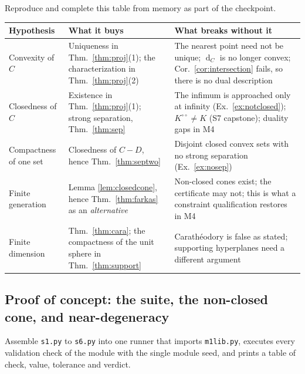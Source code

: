 \documentclass[11pt,a4paper]{article}
\theoremstyle{definition}
\theoremstyle{plain}
\theoremstyle{remark}
\DeclareMathOperator{\dist}{d}
\begin{document}
Reproduce and complete this table from memory as part of the checkpoint.

\begin{center}
\small
\begin{tabular}{@{}L{3.0cm} L{5.0cm} L{6.6cm}@{}}
\toprule
\textbf{Hypothesis} & \textbf{What it buys} & \textbf{What breaks without it} \\
\midrule
Convexity of $C$
  & Uniqueness in Thm.~\ref{thm:proj}(1); the characterization in Thm.~\ref{thm:proj}(2)
  & The nearest point need not be unique; $\dist_C$ is no longer convex;
    Cor.~\ref{cor:intersection} fails, so there is no dual description \\
Closedness of $C$
  & Existence in Thm.~\ref{thm:proj}(1); strong separation, Thm.~\ref{thm:sep}
  & The infimum is approached only at infinity (Ex.~\ref{ex:notclosed});
    $K^{\circ\circ}\ne K$ (S7 capstone); duality gaps in M4 \\
Compactness of one set
  & Closedness of $C-D$, hence Thm.~\ref{thm:septwo}
  & Disjoint closed convex sets with no strong separation
    (Ex.~\ref{ex:nosep}) \\
Finite generation
  & Lemma \ref{lem:closedcone}, hence Thm.~\ref{thm:farkas} as an \emph{alternative}
  & Non-closed cones exist; the certificate may not; this is what a constraint
    qualification restores in M4 \\
Finite dimension
  & Thm.~\ref{thm:cara}; the compactness of the unit sphere in Thm.~\ref{thm:support}
  & Carath\'eodory is false as stated; supporting hyperplanes need a different argument \\
\bottomrule
\end{tabular}
\end{center}

\subsection*{Proof of concept: the suite, the non-closed cone, and near-degeneracy}

Assemble \texttt{s1.py} to \texttt{s6.py} into one runner that imports \texttt{m1lib.py},
executes every validation check of the module with the single module seed, and prints a table of
check, value, tolerance and verdict.
\end{document}
